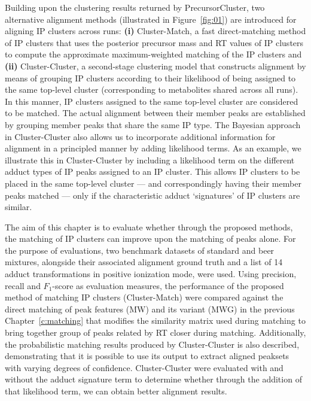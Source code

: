 Building upon the clustering results returned by PrecursorCluster, two alternative alignment methods (illustrated in Figure~\ref{fig:01}) are introduced for aligning IP clusters across runs: \textbf{(i)} Cluster-Match, a fast direct-matching method of IP clusters that uses the posterior precursor mass and RT values of IP clusters to compute the approximate maximum-weighted matching of the IP clusters and \textbf{(ii)} Cluster-Cluster, a second-stage clustering model that constructs alignment by means of grouping IP clusters according to their likelihood of being assigned to the same top-level cluster (corresponding to metabolites shared across all runs). In this manner, IP clusters assigned to the same top-level cluster are considered to be matched. The actual alignment between their member peaks are established by grouping member peaks that share the same IP type. The Bayesian approach in Cluster-Cluster also allows us to incorporate additional information for alignment in a principled manner by adding likelihood terms. As an example, we illustrate this in Cluster-Cluster by including a likelihood term on the different adduct types of IP peaks assigned to an IP cluster. This allows IP clusters to be placed in the same top-level cluster --- and correspondingly having their member peaks matched --- only if the characteristic adduct `signatures' of IP clusters are similar.

The aim of this chapter is to evaluate whether through the proposed methods, the matching of IP clusters can improve upon the matching of peaks alone. For the purpose of evaluations, two benchmark datasets of standard and beer mixtures, alongside their associated alignment ground truth and a list of 14 adduct transformations in positive ionization mode, were used. Using precision, recall and $F_1$-score as evaluation measures, the performance of the proposed method of matching IP clusters (Cluster-Match) were compared against the direct matching of peak features (MW) and its variant (MWG) in the previous Chapter~\ref{c:matching} that modifies the similarity matrix used during matching to bring together group of peaks related by RT closer during matching. Additionally, the probabilistic matching results produced by Cluster-Cluster is also described, demonstrating that it is possible to use its output to extract aligned peaksets with varying degrees of confidence. Cluster-Cluster were evaluated with and without the adduct signature term to determine whether through the addition of that likelihood term, we can obtain better alignment results.

